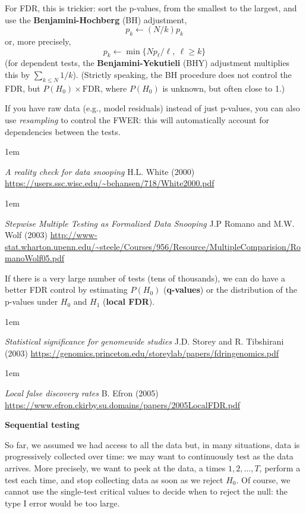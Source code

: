 \documentclass[a5paper]{article}
\let\d\textbf
\let\leq\leqslant
\let\geq\geqslant
\newenvironment{reference}{%
  \medskip\goodbreak
  \parskip 0pt
  \raggedright
  \leftskip 1em
  \obeylines
}{\par\medskip\goodbreak}
\def\subsection#1{{\par\bigskip\goodbreak\large\bfseries #1\par}}
\begin{document}
For FDR, this is trickier:
sort the p-values, from the smallest to the largest, and use the \d{Benjamini-Hochberg} (BH) adjustment,
\[ p_k \leftarrow (N/k) p_k \]
or, more precisely,
\[ p_k \leftarrow \min \bigl\{ N p_\ell / \ell , \ \ell \geq k \bigr\} \]
(for dependent tests, the \d{Benjamini-Yekutieli} (BHY) adjustment multiplies this by
$\sum_{k \leq N} 1/k$).
(Strictly speaking, the BH procedure does not control the FDR, but $P(H_0) \times\text{FDR}$,
where $P(H_0)$ is unknown, but often close to 1.)

If you have raw data (e.g., model residuals) instead of just p-values,
you can also use \emph{resampling} to control the FWER:
this will automatically account for dependencies between the tests.

\begin{reference}
  \emph{A reality check for data snooping}
  H.L. White (2000)
  \url{https://users.ssc.wisc.edu/~behansen/718/White2000.pdf}
\end{reference}

\begin{reference}
  \emph{Stepwise Multiple Testing as Formalized Data Snooping}
  J.P Romano and M.W. Wolf (2003)
  \url{http://www-stat.wharton.upenn.edu/~steele/Courses/956/Resource/MultipleComparision/RomanoWolf05.pdf}
\end{reference}

If there is a very large number of tests (tens of thousands),
we can do have a better FDR control
by estimating $P(H_0)$ (\d{q-values})
or the distribution of the p-values under $H_0$ and $H_1$ (\d{local FDR}).

\begin{reference}
  \emph{Statistical significance for genomewide studies}
  J.D. Storey and R. Tibshirani (2003)
  \url{https://genomics.princeton.edu/storeylab/papers/fdringenomics.pdf}
\end{reference}

\begin{reference}
  \emph{Local false discovery rates}
  B. Efron (2005)
  \url{https://www.efron.ckirby.su.domains/papers/2005LocalFDR.pdf}
\end{reference}

\subsection{Sequential testing}

So far, we assumed we had access to all the data but,
in many situations, data is progressively collected over time:
we may want to continuously test as the data arrives.
More precisely, we want to peek at the data,
a times $1,2,\dots,T$, perform a test each time, and stop collecting data as soon as we reject $H_0$.
Of course, we cannot use the single-test critical values to decide when to reject the null:
the type I error would be too large.
\end{document}
